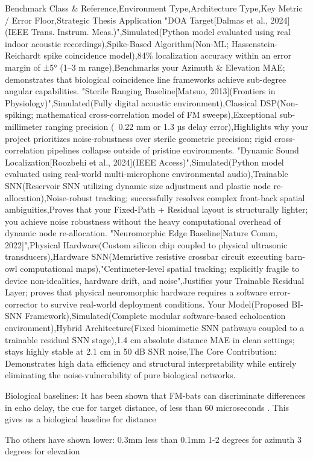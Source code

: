 {Benchmark Class & Reference,Environment Type,Architecture Type,Key Metric / Error Floor,Strategic Thesis Application
"DOA Target[Dalmas et al., 2024](IEEE Trans. Instrum. Meas.)",Simulated(Python model evaluated using real indoor acoustic recordings),Spike-Based Algorithm(Non-ML; Hassenstein-Reichardt spike coincidence model),84\% localization accuracy within an error margin of ±5° (1–3 m range),Benchmarks your Azimuth & Elevation MAE; demonstrates that biological coincidence line frameworks achieve sub-degree angular capabilities.
"Sterile Ranging Baseline[Matsuo, 2013](Frontiers in Physiology)",Simulated(Fully digital acoustic environment),Classical DSP(Non-spiking; mathematical cross-correlation model of FM sweeps),Exceptional sub-millimeter ranging precision (~0.22 mm or 1.3 µs delay error),Highlights why your project prioritizes noise-robustness over sterile geometric precision; rigid cross-correlation pipelines collapse outside of pristine environments.
"Dynamic Sound Localization[Roozbehi et al., 2024](IEEE Access)",Simulated(Python model evaluated using real-world multi-microphone environmental audio),Trainable SNN(Reservoir SNN utilizing dynamic size adjustment and plastic node re-allocation),Noise-robust tracking; successfully resolves complex front-back spatial ambiguities,Proves that your Fixed-Path + Residual layout is structurally lighter; you achieve noise robustness without the heavy computational overhead of dynamic node re-allocation.
"Neuromorphic Edge Baseline[Nature Comm, 2022]",Physical Hardware(Custom silicon chip coupled to physical ultrasonic transducers),Hardware SNN(Memristive resistive crossbar circuit executing barn-owl computational maps),"Centimeter-level spatial tracking; explicitly fragile to device non-idealities, hardware drift, and noise",Justifies your Trainable Residual Layer; proves that physical neuromorphic hardware requires a software error-corrector to survive real-world deployment conditions.
Your Model(Proposed BI-SNN Framework),Simulated(Complete modular software-based echolocation environment),Hybrid Architecture(Fixed biomimetic SNN pathways coupled to a trainable residual SNN stage),1.4 cm absolute distance MAE in clean settings; stays highly stable at 2.1 cm in 50 dB SNR noise,The Core Contribution: Demonstrates high data efficiency and structural interpretability while entirely eliminating the noise-vulnerability of pure biological networks.


Biological baselines:
It has been shown that FM-bats can discriminate differences in echo delay, the cue for target distance, of less than 60 microseconds \cite{Simmons1973TheBats}. This gives us a biological baseline for distance

Tho others have shown lower:
0.3mm \cite{Kanwal2007AuditoryCommunication}
less than 0.1mm \cite{Ulanovsky2009IntroductionSemester}
1-2 degrees for azimuth \cite{Ulanovsky2009IntroductionSemester}
3 degrees for elevation \cite{Lawrence1982EcholocationTargets}


}